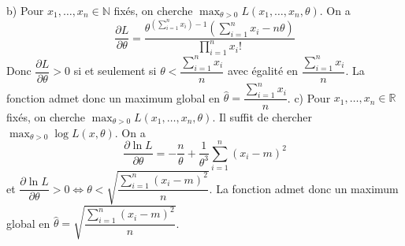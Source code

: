 \documentclass{fancybook}
\begin{document}
b) Pour $x_1,\ldots, x_n\in \mathbb N$ fixés, on cherche $\displaystyle \max_{\theta > 0} L(x_1,\ldots,x_n,\theta)$. On a $$\dfrac{\partial L}{\partial \theta} = \dfrac{\theta^{(\sum_{i=1}^nx_i) -1 }\left(\sum_{i=1}^nx_i - n\theta  \right)}{\prod_{i=1}^n x_i!}$$
Donc $\dfrac{\partial L}{\partial \theta} >0$ si et seulement si $\theta <\dfrac{\sum_{i=1}^n x_i}{n}$ avec égalité en $\dfrac{\sum_{i=1}^n x_i}{n}$. \newline
La fonction admet donc un maximum global en $\displaystyle \hat{\theta} = \dfrac{\sum_{i=1}^n x_i}{n}$.\newline 
\newline 
c) Pour $x_1,\ldots, x_n\in \mathbb R$ fixés, on cherche $\displaystyle \max_{\theta > 0} L(x_1,\ldots,x_n,\theta)$. Il suffit de chercher $\max_{\theta >0}\log L(x,\theta)$. On a $$\dfrac{\partial\ln L}{\partial \theta}= -\dfrac{n}{\theta} + \dfrac{1}{\theta^3}\sum_{i=1}^n(x_i-m)^2$$
et $\dfrac{\partial\ln L}{\partial \theta}>0 \iff \theta < \sqrt{\dfrac{\sum_{i=1}^n (x_i-m)^2}{n}} $. \newline
La fonction admet donc un maximum global en $\displaystyle \hat{\theta} = \sqrt{\dfrac{\sum_{i=1}^n (x_i-m)^2}{n}}$.\newline
\end{document}
